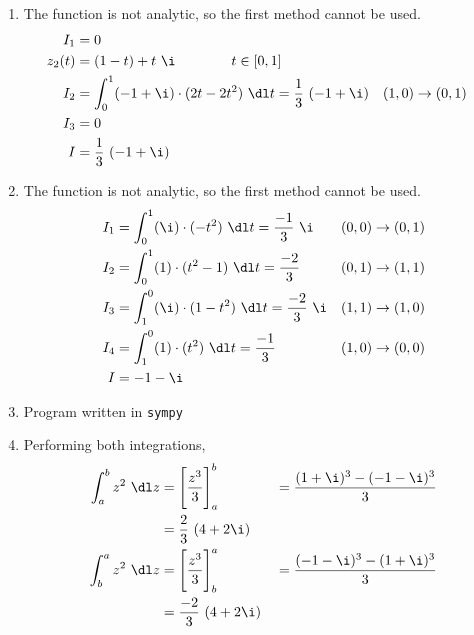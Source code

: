 \begin{enumerate}
    \item The function is \textcolor{y_p}{not analytic}, so the first method cannot be
          used.
          \begin{align}
              I_1         & = 0                                               \\
              z_2(t)      & = (1-t) + t\ \i \qquad\qquad t \in [0, 1]         \\
              I_2         & = \int_{0}^{1} (-1 + \i) \cdot (2t - 2t^2)\ \dl t
              = \frac{1}{3}
              \ (-1 + \i) &
              (1, 0)      & \to (0, 1)                                        \\
              I_3         & = 0                                               \\
              I           & = \frac{1}{3}\ (-1 + \i)
          \end{align}

    \item The function is \textcolor{y_p}{not analytic}, so the first method cannot be
          used.
          \begin{align}
              I_1    & = \int_{0}^{1} (\i) \cdot (-t^2)\ \dl t = \frac{-1}{3}\ \i    &
              (0, 0) & \to (0, 1)                                                      \\
              I_2    & = \int_{0}^{1} (1) \cdot (t^2 - 1)\ \dl t = \frac{-2}{3}      &
              (0, 1) & \to (1, 1)                                                      \\
              I_3    & = \int_{1}^{0} (\i) \cdot (1 - t^2)\ \dl t = \frac{-2}{3}\ \i &
              (1, 1) & \to (1, 0)                                                      \\
              I_4    & = \int_{1}^{0} (1) \cdot (t^2)\ \dl t = \frac{-1}{3}          &
              (1, 0) & \to (0, 0)                                                      \\
              I      & = -1 - \i
          \end{align}

    \item Program written in \texttt{sympy}

    \item Performing both integrations,
          \begin{align}
              \int_{a}^{b} z^2\ \dl z & = \Bigg[ \frac{z^3}{3} \Bigg]_a^b &
                                      & = \frac{(1+\i)^3 - (-1-\i)^3}{3}    \\
                                      & =\frac{2}{3}\ (4 + 2\i)             \\
              \int_{b}^{a} z^2\ \dl z & = \Bigg[ \frac{z^3}{3} \Bigg]_b^a &
                                      & = \frac{(-1-\i)^3 - (1+\i)^3}{3}    \\
                                      & =\frac{-2}{3}\ (4 + 2\i)
          \end{align}


\end{enumerate}

